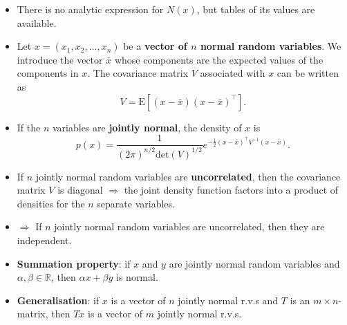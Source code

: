 \begin{itemize}[label=\textbullet]
    \item There is no analytic expression for \( N(x) \), but tables of its values are available.
    \item Let \( x = (x_1, x_2, \ldots, x_n) \) be a \textbf{vector of \( n \) normal random variables}. We introduce the vector \( \bar{x} \) whose components are the expected values of the components in \( x \). The covariance matrix \( V \) associated with \( x \) can be written as
    \[
    V = \text{E}[(x - \bar{x})(x - \bar{x})^\top].
    \]
    \item If the \( n \) variables are \textbf{jointly normal}, the density of \( x \) is
    \[
    p(x) = \frac{1}{(2\pi)^{n/2} \text{det}(V)^{1/2}} e^{-\frac{1}{2} (x - \bar{x})^\top V^{-1} (x - \bar{x})}.
    \]
\end{itemize}



\begin{itemize}[label=\textbullet]
    \item If \( n \) jointly normal random variables are \textbf{uncorrelated}, then the covariance matrix \( V \) is diagonal \(\Rightarrow\) the joint density function factors into a product of densities for the \( n \) separate variables.
    \item \(\Rightarrow\) If \( n \) jointly normal random variables are uncorrelated, then they are independent.
    \item \textbf{Summation property}: if \( x \) and \( y \) are jointly normal random variables and \( \alpha, \beta \in \mathbb{R} \), then \( \alpha x + \beta y \) is normal.
    \item \textbf{Generalisation}: if \( x \) is a vector of \( n \) jointly normal r.v.s and \( T \) is an \( m \times n \)-matrix, then \( T x \) is a vector of \( m \) jointly normal r.v.s.
\end{itemize}




